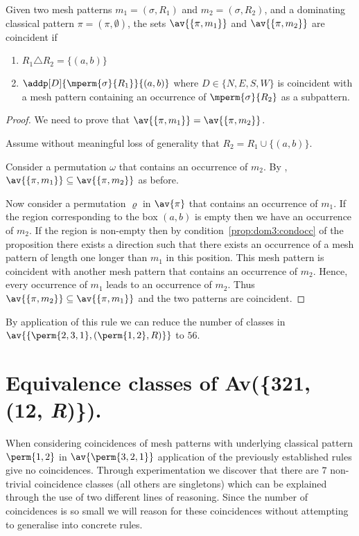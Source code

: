 \begin{proposition}
    \label{prop:dom3}
    Given two mesh patterns \(m_1 =(\sigma, R_1)\) and \(m_2 = (\sigma, R_2)\),
    and a dominating classical pattern \(\pi = (\pi,\emptyset)\), the sets
    \(\av{\{\pi,m_1\}}\) and \(\av{\{\pi,m_2\}}\) are coincident if
    \begin{enumerate}
        \item \(R_1 \triangle R_2 = \{(a,b)\}\)
        \item\label{prop:dom3:condocc} \(\addp[D]{\mperm{\sigma}{R_1}}{(a,b)}\)
            where \(D\in\{N,E,S,W\}\)
            is coincident with a mesh pattern containing an occurrence of
            \(\mperm{\sigma}{R_2}\) as a subpattern.
    \end{enumerate}
\end{proposition}
\begin{proof}
    We need to prove that \(\av{\{\pi,m_1\}} = \av{\{\pi,m_2\}}\).

    \noindent Assume without meaningful loss of generality that \(R_2 = R_1 \cup \{(a,b)\}\).

    Consider a permutation \(\omega\) that contains an occurrence of \(m_2\).
    By ,
     \(\av{\{\pi,m_1\}} \subseteq \av{\{\pi,m_2\}}\) as before.

    Now consider a permutation \(\varrho\) in \(\av{\pi}\) that contains an
    occurrence of \(m_1\). If the region corresponding to the box \((a,b)\)
    is empty then we have an occurrence of \(m_2\). If the region is non-empty
    then by condition~\ref{prop:dom3:condocc}  of the proposition there exists
    a direction such that there exists an occurrence of a mesh pattern of
    length one longer than \(m_1\) in this position. This mesh pattern is
    coincident with another mesh pattern that contains an
    occurrence of \(m_2\). Hence, every occurrence of \(m_1\) leads to an occurrence
    of \(m_2\).  Thus \(\av{\{\pi,m_2\}} \subseteq \av{\{\pi,m_1\}}\) and the
    two patterns are coincident.
\end{proof}

By application of this rule we can reduce the number of classes in
\(\av{\{\perm{2,3,1},(\perm{1,2}, R)\}}\) to \(56\).

\section{Equivalence classes of Av(\{321, (12, \textit{R})\}).}
When considering coincidences of mesh patterns with underlying classical
pattern \(\perm{1,2}\) in \(\av{\perm{3,2,1}}\) application of the previously
established rules give no coincidences. Through experimentation we discover
that there are \(7\) non-trivial coincidence classes (all others are singletons)
which can be explained through the
use of two different lines of reasoning. Since the number of coincidences is
so small we will reason for these coincidences without attempting to generalise
into concrete rules.

